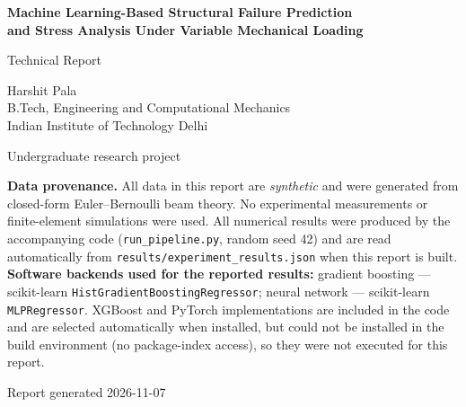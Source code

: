\documentclass[11pt,a4paper]{article}
\begin{document}
\begin{titlepage}
\centering
\vspace*{2.5cm}
{\LARGE\bfseries Machine Learning-Based Structural Failure Prediction\\[4pt] and Stress Analysis Under Variable Mechanical Loading\par}
\vspace{1.2cm}
{\large Technical Report\par}
\vspace{0.6cm}
{\large Harshit Pala\\ B.Tech, Engineering and Computational Mechanics\\ Indian Institute of Technology Delhi\par}
\vspace{1.2cm}
{\normalsize Undergraduate research project\par}
\vfill
\begin{minipage}{0.86\textwidth}\small
\textbf{Data provenance.} All data in this report are \emph{synthetic} and were generated from closed-form
Euler--Bernoulli beam theory. No experimental measurements or finite-element simulations were used. All numerical
results were produced by the accompanying code (\texttt{run\_pipeline.py}, random seed 42) and are read
automatically from \texttt{results/experiment\_results.json} when this report is built.\\[4pt]
\textbf{Software backends used for the reported results:} gradient boosting --- scikit-learn \texttt{HistGradientBoostingRegressor}; neural network --- scikit-learn \texttt{MLPRegressor}. XGBoost and PyTorch implementations are included in the code and are selected automatically when installed, but could not be installed in the build environment (no package-index access), so they were not executed for this report.
\end{minipage}
\vspace{1cm}

{\small Report generated 2026-11-07\par}
\end{titlepage}

\tableofcontents
\newpage
\end{document}
